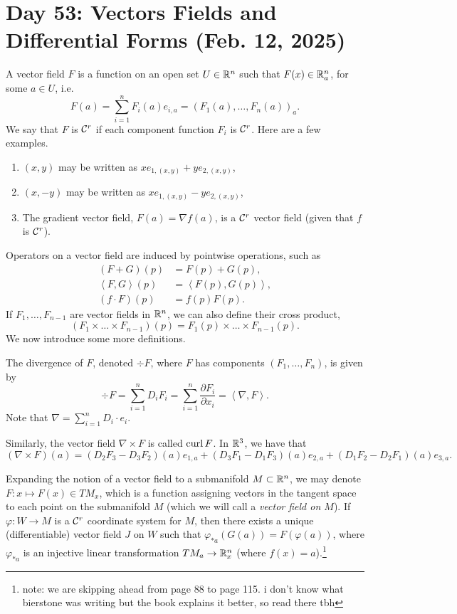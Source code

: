 \section{Day 53: Vectors Fields and Differential Forms (Feb. 12, 2025)}
A vector field $F$ is a function on an open set $U \in \mathbb R^n$ such that $F(x) \in \mathbb R^n_a$, for some $a \in U$, i.e.
\[ F(a) = \sum_{i=1}^n F_i(a) e_{i,a} = (F_1(a), \dots, F_n(a))_a. \]
We say that $F$ is $\mathcal C^r$ if each component function $F_i$ is $\mathcal C^r$. Here are a few examples.
\begin{enumerate}[label=(\roman*)]
    \item $(x, y)$ may be written as $xe_{1,(x,y)} + ye_{2,(x,y)}$,
    \item $(x, -y)$ may be written as $xe_{1,(x,y)} - ye_{2,(x,y)}$,
    \item The gradient vector field, $F(a) = \nabla f(a)$, is a $\mathcal C^r$ vector field (given that $f$ is $\mathcal C^r$).
\end{enumerate}
Operators on a vector field are induced by pointwise operations, such as
\begin{align*}
    (F + G)(p) &= F(p) + G(p), \\
    \left<F, G\right>(p) &= \left<F(p), G(p)\right>, \\
    (f \cdot F)(p) &= f(p) F(p).
\end{align*}
If $F_1, \dots, F_{n-1}$ are vector fields in $\mathbb R^n$, we can also define their cross product,
\[ (F_1 \times \dots \times F_{n-1})(p) = F_1(p) \times \dots \times F_{n-1}(p). \]
We now introduce some more definitions.
\begin{definition}[Divergence]
    The divergence of $F$, denoted $\div F$, where $F$ has components $(F_1, \dots, F_n)$, is given by
    \[ \div F = \sum_{i=1}^n D_i F_i = \sum_{i=1}^n \frac{\partial F_i}{\partial x_i} = \left<\nabla, F\right>. \]
    Note that $\nabla = \sum_{i=1}^n D_i \cdot e_i$.
\end{definition}
\begin{definition}[Curl]
    Similarly, the vector field $\nabla \times F$ is called $\operatorname{curl} F$. In $\mathbb R^3$, we have that
    \[ (\nabla \times F)(a) = (D_2F_3 - D_3F_2)(a)e_{1,a} + (D_3F_1 - D_1F_3)(a)e_{2,a} + (D_1F_2 - D_2F_1)(a)e_{3,a}. \]
\end{definition}
\noindent Expanding the notion of a vector field to a submanifold $M \subset \mathbb R^n$, we may denote $F : x \mapsto F(x) \in TM_x$, which is a function assigning vectors in the tangent space to each point on the submanifold $M$ (which we will call a \textit{vector field on $M$}). If $\varphi : W \to M$ is a $\mathcal C^r$ coordinate system for $M$, then there exists a unique (differentiable) vector field $J$ on $W$ such that $\varphi_{\ast a}(G(a)) = F(\varphi(a))$, where $\varphi_{\ast a}$ is an injective linear transformation $TM_a \to \mathbb R^n_x$ (where $f(x) = a$).\footnote{note: we are skipping ahead from page 88 to page 115. i don't know what bierstone was writing but the book explains it better, so read there tbh}

